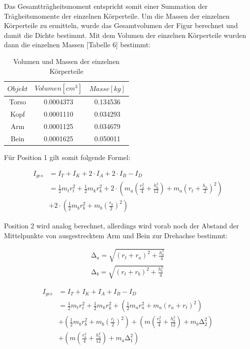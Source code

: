 Das Gesamtträgheitsmoment entspricht somit einer Summation der Trägheitsmomente der einzelnen
Körperteile. Um die Massen der einzelnen Körperteile zu ermitteln, wurde das Gesamtvolumen der
Figur berechnet und damit die Dichte bestimmt. Mit dem Volumen der einzelnen Körperteile wurden
dann die einzelnen Massen [Tabelle 6] bestimmt:

\begin{table}
  \centering
  \caption{Volumen und Massen der einzelnen Körperteile}
  \begin{tabular}{c | c c}
    \toprule $Objekt$ & $Volumen [cm^3]$ & $Masse [kg]$ \\
    \midrule
    Torso & 0.0004373 & 0.134536 \\
    Kopf  & 0.0001110 & 0.034293 \\
    Arm   & 0.0001125 & 0.034679 \\
    Bein  & 0.0001625 & 0.050011 \\
  \end{tabular}
\end{table}

\newpage

Für Position 1 gilt somit folgende Formel:

\begin{align}
  I_{ges} &= I_T + I_K + 2 \cdot I_A + 2 \cdot I_B - I_D\\
          &= \frac{1}{2} m_t r_t^2 + \frac{1}{2} m_k r_k^2 + 2 \cdot (m_a(\frac{r_a^2}{4} + \frac{h_a^2}{12}) + m_a(r_t + \frac{h_a}{2})^2) \\
          &+ 2 \cdot (\frac{1}{2} m_b r_b^2 + m_b(\frac{r_b}{2})^2)
\end{align}

Position 2 wird analog berechnet, allerdings wird vorab noch der Abstand der Mittelpunkte von
ausgestrecktem Arm und Bein zur Drehachse bestimmt:

\begin{align}
  \increment_a = \sqrt{(r_t + r_a)^2 + \frac{h_a^2}{4}} \\
  \increment_b = \sqrt{(r_t + r_b)^2 + \frac{h_b^2}{4}}
\end{align}

\begin{align}
  I_{ges} &= I_T + I_K + I_A + I_B - I_D\\
          &= \frac{1}{2} m_t r_t^2 + \frac{1}{2} m_k r_k^2 + (\frac{1}{2} m_a r_a^2 + m_a (r_a + r_t)^2) \\
          &+ (\frac{1}{2} m_b r_b^2 + m_b (\frac{r_t}{2})^2) + (m(\frac{r_b^2}{4} + \frac{h_b^2}{12}) + m_b\increment_2^2) \\
          &+ (m(\frac{r_a^2}{4} + \frac{h_a^2}{12}) + m_a\increment_1^2)
\end{align}

